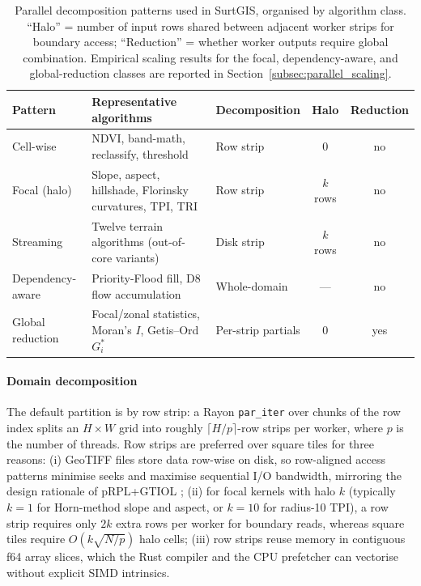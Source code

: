 \documentclass[preprint,review,12pt,authoryear]{elsarticle}
\begin{document}
\begin{table}[htbp]
\centering
\caption{Parallel decomposition patterns used in SurtGIS, organised by algorithm class. ``Halo'' = number of input rows shared between adjacent worker strips for boundary access; ``Reduction'' = whether worker outputs require global combination. Empirical scaling results for the focal, dependency-aware, and global-reduction classes are reported in Section~\ref{subsec:parallel_scaling}.}
\label{tab:parallel_patterns}
\begin{tabular}{@{}l p{3.5cm} l c c@{}}
\toprule
Pattern & Representative algorithms & Decomposition & Halo & Reduction \\
\midrule
Cell-wise            & NDVI, band-math, reclassify, threshold                       & Row strip      & 0       & no  \\
Focal (halo)         & Slope, aspect, hillshade, Florinsky curvatures, TPI, TRI     & Row strip      & $k$ rows & no \\
Streaming            & Twelve terrain algorithms (out-of-core variants)             & Disk strip     & $k$ rows & no \\
Dependency-aware     & Priority-Flood fill, D8 flow accumulation                    & Whole-domain   & ---     & no  \\
Global reduction     & Focal/zonal statistics, Moran's $I$, Getis--Ord $G_i^*$       & Per-strip partials & 0   & yes \\
\bottomrule
\end{tabular}
\end{table}

\paragraph{Domain decomposition} The default partition is by row strip: a Rayon \texttt{par\_iter} over chunks of the row index splits an $H \times W$ grid into roughly $\lceil H/p \rceil$-row strips per worker, where $p$ is the number of threads. Row strips are preferred over square tiles for three reasons: (i) GeoTIFF files store data row-wise on disk, so row-aligned access patterns minimise seeks and maximise sequential I/O bandwidth, mirroring the design rationale of pRPL+GTIOL \citep{miao2017prplgtiol}; (ii) for focal kernels with halo $k$ (typically $k=1$ for Horn-method slope and aspect, or $k=10$ for radius-10 TPI), a row strip requires only $2k$ extra rows per worker for boundary reads, whereas square tiles require $O(k\sqrt{N/p})$ halo cells; (iii) row strips reuse memory in contiguous f64 array slices, which the Rust compiler and the CPU prefetcher can vectorise without explicit SIMD intrinsics.
\end{document}
